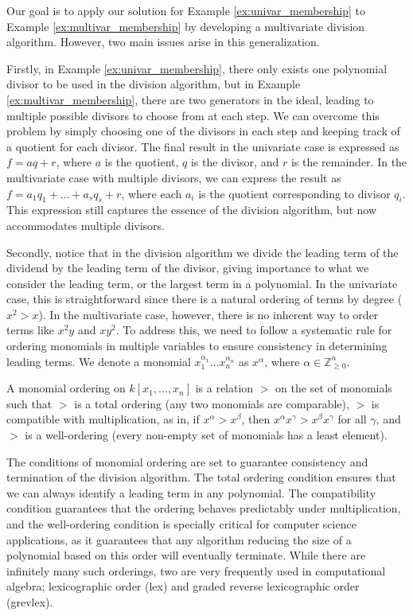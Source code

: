 Our goal is to apply our solution for Example \ref{ex:univar_membership} to Example \ref{ex:multivar_membership} by developing a multivariate division algorithm. However, two main issues arise in this generalization.

Firstly, in Example \ref{ex:univar_membership}, there only exists one polynomial divisor to be used in the division algorithm, but in Example \ref{ex:multivar_membership}, there are two generators in the ideal, leading to multiple possible divisors to choose from at each step. We can overcome this problem by simply choosing one of the divisors in each step and keeping track of a quotient for each divisor. The final result in the univariate case is expressed as $f = aq + r$, where $a$ is the quotient, $q$ is the divisor, and $r$ is the remainder. In the multivariate case with multiple divisors, we can express the result as $f = a_1 q_1 + \dots + a_s q_s + r$, where each $a_i$ is the quotient corresponding to divisor $q_i$. This expression still captures the essence of the division algorithm, but now accommodates multiple divisors.

Secondly, notice that in the division algorithm we divide the leading term of the dividend by the leading term of the divisor, giving importance to what we consider the leading term, or the largest term in a polynomial. In the univariate case, this is straightforward since there is a natural ordering of terms by degree ($x^2 > x$). In the multivariate case, however, there is no inherent way to order terms like $x^2 y$ and $x y^2$. To address this, we need to follow a systematic rule for ordering monomials in multiple variables to ensure consistency in determining leading terms. We denote a monomial $x_1^{\alpha_1} \dots x_n^{\alpha_n}$ as $x^\alpha$, where $\alpha \in \mathbb{Z}_{\ge 0}^n$.

\begin{definition}
\label{def:monomial_ordering}
A monomial ordering on $k[x_1, \dots, x_n]$ is a relation $>$ on the set of monomials such that $>$ is a total ordering (any two monomials are comparable), $>$ is compatible with multiplication, as in, if $x^\alpha > x^\beta$, then $x^\alpha x^\gamma > x^\beta x^\gamma$ for all $\gamma$, and $>$ is a well-ordering (every non-empty set of monomials has a least element).
\end{definition}

The conditions of monomial ordering are set to guarantee consistency and termination of the division algorithm. The total ordering condition ensures that we can always identify a leading term in any polynomial. The compatibility condition guarantees that the ordering behaves predictably under multiplication, and the well-ordering condition is specially critical for computer science applications, as it guarantees that any algorithm reducing the size of a polynomial based on this order will eventually terminate. While there are infinitely many such orderings, two are very frequently used in computational algebra; lexicographic order (lex) and graded reverse lexicographic order (grevlex).

